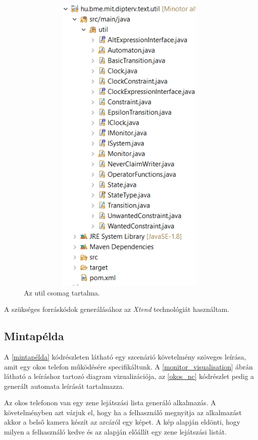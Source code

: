 \begin{figure}[!ht]
    \centering
    \includegraphics[width=180mm, height= 15cm, keepaspectratio]{figures/util_csomag.png}
    \caption{Az util csomag tartalma.}
	\label{util_csomag}
\end{figure}

A szükséges forráskódok generálásához az \textit{Xtend} technológiát használtam.

\clearpage\subsection{Mintapélda}

A \ref{mintapélda} kódrészleten látható egy szcenárió követelmény szöveges leírása, amit egy okos telefon működésére specifikáltunk.
A \ref{monitor_visualisation} ábrán látható a leíráshoz tartozó diagram vizualizációja, az \ref{okos_nc} kódrészlet pedig a generált automata leírását tartalmazza.

Az okos telefonon van egy zene lejátszási lista generáló alkalmazás.
A követelményben azt várjuk el, hogy ha a felhasználó megnyitja az alkalmazást akkor a belső kamera készít az arcáról egy képet.
A kép alapján eldönti, hogy milyen a felhasználó kedve és az alapján előállít egy zene lejátszási listát.

